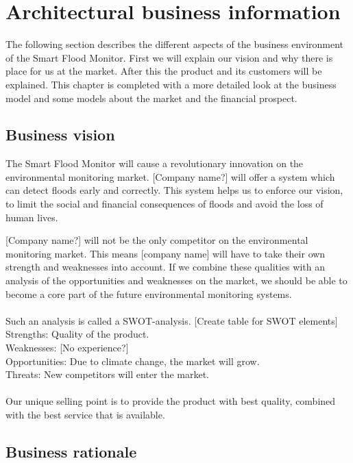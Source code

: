 \chapter{Architectural business information}
\label{ch:business}
The following section describes the different aspects of the business environment of the Smart Flood Monitor. First we will explain our vision and why there is place for us at the market. After this the product and its customers will be explained. This chapter is completed with a more detailed look at the business model and some models about the market and the financial prospect.

\section{Business vision}
The Smart Flood Monitor will cause a revolutionary innovation on the environmental monitoring market. [Company name?] will offer a system which can detect floods early and correctly. This system helps us to enforce our vision, to limit the social and financial consequences of floods and avoid the loss of human lives. 

[Company name?] will not be the only competitor on the environmental monitoring market. This means [company name] will have to take their own strength and weaknesses into account. If we combine these qualities with an analysis of the opportunities and weaknesses on the market, we should be able to become a core part of the future environmental monitoring systems.\\\\

Such an analysis is called a SWOT-analysis. 
[Create table for SWOT elements]\\
Strengths: Quality of the product.\\ 
Weaknesses: [No experience?]\\
Opportunities: Due to climate change, the market will grow. \\
Threats: New competitors will enter the market.\\\\

Our unique selling point is to provide the product with best quality, combined with the best service that is available.

\section{Business rationale}

